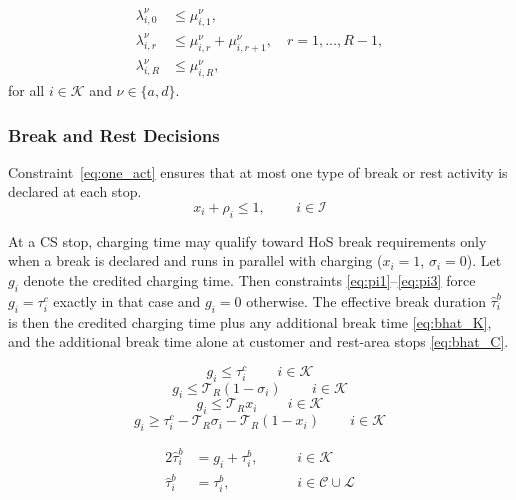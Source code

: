 \documentclass[preprint,12pt,3p]{elsarticle}
\begin{document}
\begin{align}
    \lambda_{i,0}^{\nu}   &\leq \mu_{i,1}^{\nu},
    \label{eq:sos2_lo}\\
    \lambda_{i,r}^{\nu}   &\leq \mu_{i,r}^{\nu} + \mu_{i,r+1}^{\nu},
    \quad r = 1,\ldots,R-1,
    \label{eq:sos2_mid}\\
    \lambda_{i,R}^{\nu}   &\leq \mu_{i,R}^{\nu},
    \label{eq:sos2_hi}
\end{align}
for all $i\in\mathcal{K}$ and $\nu\in\{a,d\}$.


\subsubsection{Break and Rest Decisions}
Constraint~\eqref{eq:one_act} ensures that at most one type of break or rest activity is declared at each stop.
\begin{equation}
    x_i    + \rho_i \leq 1,
    \qquad \, i \in \mathcal{I}
    \label{eq:one_act}
\end{equation}

At a CS stop, charging time may qualify toward HoS break requirements only when a break is declared and runs in parallel with charging ($x_i = 1$, $\sigma_i = 0$).
Let $g_i$ denote the credited charging time. Then constraints \eqref{eq:pi1}--\eqref{eq:pi3} force $g_i = \tau_i^c$ exactly in that case and $g_i = 0$ otherwise.
The effective break duration $\hat \tau_i^b$ is then the credited charging time plus any additional break time \eqref{eq:bhat_K}, and the additional break time alone at customer and rest-area stops \eqref{eq:bhat_C}.

\begin{equation}
    g_i \leq \tau_i^c
    \qquad \, i \in \mathcal{K}
    \label{eq:pi1}
\end{equation}
\begin{equation}
    g_i \leq \mathcal T_R (1- \sigma_i)
    \qquad \, i \in \mathcal{K}
    \label{eq:pi2}
\end{equation}
\begin{equation}
    g_i \leq \mathcal T_R x_i
    \qquad \, i \in \mathcal{K}
    \label{eq:pi21}
\end{equation}
\begin{equation}
    g_i \geq \tau_i^c - \mathcal T_R \sigma_i - \mathcal T_R (1-x_i)
    \qquad \, i \in \mathcal{K}
    \label{eq:pi3}
\end{equation}

\begin{alignat}{2}
    \hat{\tau}_i^b &= g_i+ \tau_i^b, &\quad& \, i \in \mathcal{K}
    \label{eq:bhat_K}\\
    \hat{\tau}_i^b &= \tau_i^b,            &\quad& \, i \in \mathcal{C} \cup \mathcal L
    \label{eq:bhat_C}
\end{alignat}
\end{document}
